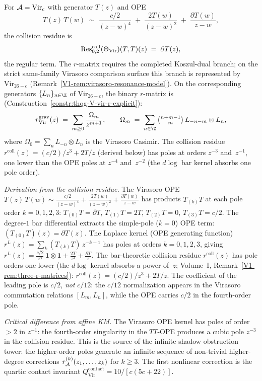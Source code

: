 \begin{computation}
For $\mathcal{A} = \mathrm{Vir}_c$ with generator $T(z)$ and OPE
\[
T(z)\,T(w)
\;\sim\;
\frac{c/2}{(z-w)^4}
\;+\;
\frac{2T(w)}{(z-w)^2}
\;+\;
\frac{\partial T(w)}{z-w},
\]
the collision residue is
\begin{equation}%
\Rescoll_{0,2}(\Theta_{\mathrm{Vir}})
 (T, T)(z)
\;=\;
\partial T(z),
\end{equation}
the regular term. The $r$-matrix requires the completed
Koszul-dual branch; on the strict same-family Virasoro comparison
surface this branch is represented by $\mathrm{Vir}_{26-c}$
(Remark~\ref{V1-rem:virasoro-resonance-model}). On the corresponding
generators $\{L_n\}_{n \in \Z}$ of $\mathrm{Vir}_{26-c}$, the
binary $r$-matrix is
(Construction~\ref{constr:thqg-V-vir-r-explicit}):
\begin{equation}%
\rgrav_{\mathrm{Vir}}(z)
\;=\;
\sum_{m \geq 0}
\frac{\Omega_m}{z^{m+1}},
\qquad
\Omega_m
\;=\;
\sum_{n \in \Z}
\tbinom{n+m-1}{m}\,
L_{-n-m} \otimes L_n,
\end{equation}
where $\Omega_0 = \sum_{n} L_{-n} \otimes L_n$ is the Virasoro
Casimir. The collision residue
$r^{\mathrm{coll}}(z) = (c/2)/z^3 + 2T/z$
(derived below) has poles at orders $z^{-3}$ and~$z^{-1}$,
one lower than the OPE poles at $z^{-4}$ and~$z^{-2}$ (the $d\log$ bar kernel absorbs one pole order).

\emph{Derivation from the collision residue.}
The Virasoro OPE
$T(z)\,T(w) \sim \frac{c/2}{(z-w)^4} + \frac{2T(w)}{(z-w)^2}
+ \frac{\partial T(w)}{z-w}$
has products $T_{(k)}T$ at each pole order $k = 0,1,2,3$:
$T_{(0)}T = \partial T$,
$T_{(1)}T = 2T$,
$T_{(2)}T = 0$,
$T_{(3)}T = c/2$.
The degree-$1$ bar differential extracts the simple-pole
($k = 0$) OPE term: $(T_{(0)}T)(z) = \partial T(z)$.
The Laplace kernel (OPE generating function)
$r^L(z) = \sum_k (T_{(k)}T)\,z^{-k-1}$
has poles at orders $k = 0,1,2,3$, giving
$r^L(z) = \frac{c/2}{z^4}\,\mathbf{1} \otimes \mathbf{1}
+ \frac{2T}{z^2} + \frac{\partial T}{z}$.
The bar-theoretic collision residue $r^{\mathrm{coll}}(z)$
has pole orders one lower (the $d\log$ kernel absorbs a power
of~$z$; Volume~I, Remark~\ref{V1-rem:three-r-matrices}):
$r^{\mathrm{coll}}(z) = (c/2)/z^3 + 2T/z$.
The coefficient of the leading pole is $c/2$, \emph{not}
$c/12$: the $c/12$ normalization appears in the Virasoro
commutation relations $[L_m, L_n]$, while the OPE carries
$c/2$ in the fourth-order pole.

\emph{Critical difference from affine KM.}
The Virasoro OPE kernel has poles of order $>2$ in $z^{-1}$: the
fourth-order singularity in the $TT$-OPE produces a cubic pole
$z^{-3}$ in the collision residue. This is the source of the
infinite shadow obstruction tower: the higher-order poles generate an infinite
sequence of non-trivial higher-degree corrections
$r_{\mathcal{A}}^{(k)}(z_1,\dotsc,z_k)$ for $k \geq 3$.
The first nonlinear correction is the quartic contact invariant
$Q^{\mathrm{contact}}_{\mathrm{Vir}} = 10/[c(5c+22)]$.
\end{computation}


